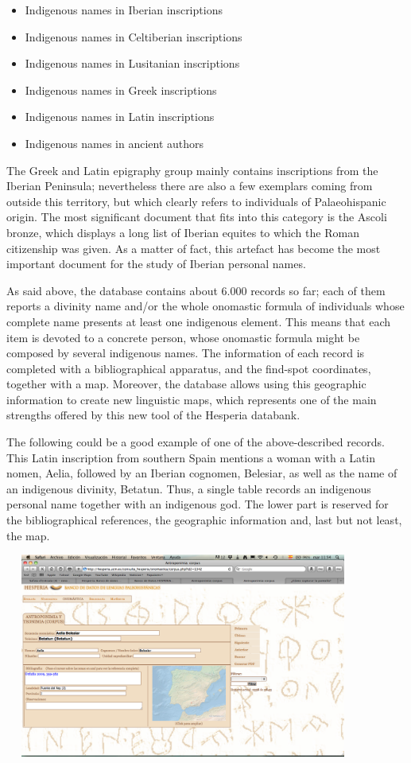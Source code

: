 \documentclass[amsthm,ebook]{saparticle}
\begin{document}
\begin{itemize}
\item Indigenous names in Iberian inscriptions
\item Indigenous names in Celtiberian inscriptions 
\item Indigenous names in Lusitanian inscriptions
\item Indigenous names in Greek inscriptions
\item Indigenous names in Latin inscriptions
\item Indigenous names in ancient authors
\end{itemize}
The Greek and Latin epigraphy group mainly contains inscriptions from the Iberian Peninsula; nevertheless there are also
a few exemplars coming from outside this territory, but which clearly refers to individuals of Palaeohispanic origin.
The most significant document that fits into this category is the Ascoli bronze, which displays a long list of Iberian
equites to which the Roman citizenship was given. As a matter of fact, this artefact has become the most important
document for the study of Iberian personal names.

As said above, the database contains about 6.000 records so far; each of them reports a divinity name and/or the whole
onomastic formula of individuals whose complete name presents at least one indigenous element. This means that each
item is devoted to a concrete person, whose onomastic formula might be composed by several indigenous names. The
information of each record is completed with a bibliographical apparatus, and the find-spot coordinates, together with
a map. Moreover, the database allows using this geographic information to create new linguistic maps, which represents
one of the main strengths offered by this new tool of the Hesperia databank.

The following could be a good example of one of the above-described records. This Latin inscription from southern Spain
mentions a woman with a Latin nomen, Aelia, followed by an Iberian cognomen, Belesiar, as well as the name of an
indigenous divinity, Betatun. Thus, a single table records an indigenous personal name together with an indigenous god.
The lower part is reserved for the bibliographical references, the geographic information and, last but not least, the
map.

 \includegraphics[width=11.749cm,height=6.712cm]{EpigraphyandonomasticsinHesperiadatabanktemplate-img003.png} 
\end{document}
